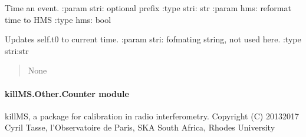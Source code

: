 \documentclass[letterpaper,10pt,english]{sphinxmanual}
\begin{document}
\begin{fulllineitems}
\begin{fulllineitems}
\label{\detokenize{api/killMS.Other:killMS.Other.ClassTimeIt.ClassTimeIt.timeit}}
\pysigstartsignatures
{}
\pysigstopsignatures
\sphinxAtStartPar
Time an event.
:param stri: optional prefix
:type stri: str
:param hms: reformat time to HMS
:type hms: bool
\begin{quote}\begin{description}
\sphinxAtStartPar
{}

\end{description}\end{quote}

\end{fulllineitems}


\begin{fulllineitems}
\label{\detokenize{api/killMS.Other:killMS.Other.ClassTimeIt.ClassTimeIt.timeitHMS}}
\pysigstartsignatures
{}
\pysigstopsignatures
\sphinxAtStartPar
Updates self.t0 to current time.
:param stri: fofmating string, not used here.
:type stri:str
\begin{quote}\begin{description}
\sphinxAtStartPar
None

\end{description}\end{quote}

\end{fulllineitems}


\end{fulllineitems}



\paragraph{killMS.Other.Counter module}
\label{\detokenize{api/killMS.Other:module-killMS.Other.Counter}}\label{\detokenize{api/killMS.Other:killms-other-counter-module}}
\sphinxAtStartPar
killMS, a package for calibration in radio interferometry.
Copyright (C) 2013\sphinxhyphen{}2017  Cyril Tasse, l’Observatoire de Paris,
SKA South Africa, Rhodes University
\end{document}
